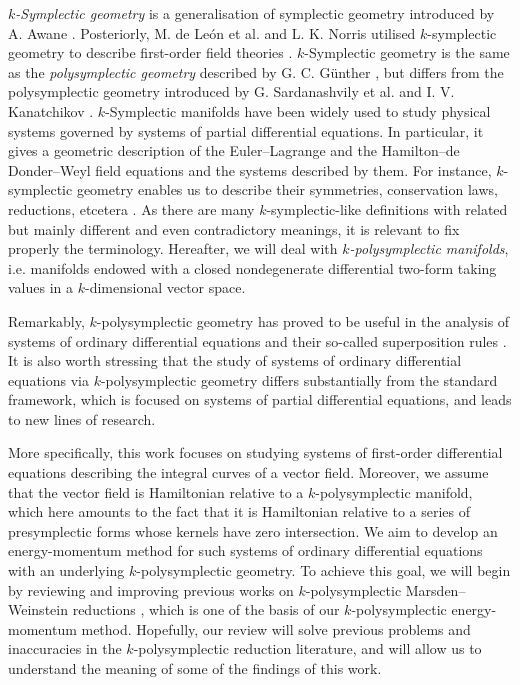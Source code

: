 \documentclass[11pt]{article}
\theoremstyle{plain}
\theoremstyle{definition}
\numberwithin{equation}{section}
\begin{document}
 {\it $k$-Symplectic geometry} is a generalisation of symplectic geometry introduced by A. Awane \cite{Awa_92,AG_00}. Posteriorly, M. de León et al. \cite{LMOS_97,LMS_88,LMS_88a} and L. K. Norris \cite{MN_00,Nor_93} utilised $k$-symplectic geometry  to describe first-order field theories \cite{BBLSV_15,EMR_96,RSV_07}. $k$-Symplectic geometry is the same as the {\it polysymplectic geometry} described by G. C. Günther \cite{Gun_87}, but differs from the polysymplectic geometry introduced by G. Sardanashvily et al. \cite{GMS_97,Sar_95} and I. V. Kanatchikov \cite{Kan_98}. $k$-Symplectic manifolds have been widely used to study physical systems governed by systems of partial differential equations. In particular, it gives a geometric description of the Euler--Lagrange and the Hamilton--de Donder--Weyl field equations 
and the systems described by them. For instance, $k$-symplectic geometry enables us to describe their symmetries, conservation laws, reductions, etcetera \cite{Awa_92, Gun_87, MRSV_15, RSV_07}. As there are many $k$-symplectic-like definitions with related but mainly different and even contradictory meanings, it is relevant to fix properly the terminology. Hereafter, we will deal with {\it $k$-polysymplectic manifolds}, i.e. manifolds endowed with a closed nondegenerate differential two-form taking values in a $k$-dimensional vector space. 
 
 
 Remarkably, $k$-polysymplectic geometry has proved to be useful in the analysis of systems of ordinary differential equations and their so-called superposition rules \cite{LV_15}. It is also worth stressing that the study of systems of ordinary differential equations via $k$-polysymplectic geometry differs substantially from the standard framework, which is focused on systems of partial differential equations, and leads to new lines of research.

More specifically, this work focuses on studying systems of first-order differential equations describing the integral curves of a vector field. Moreover, we assume that the vector field is Hamiltonian relative to a $k$-polysymplectic manifold, which here amounts to the fact that it is Hamiltonian relative to a series of presymplectic forms whose kernels have zero intersection. We aim to develop an energy-momentum method for such systems of ordinary differential equations with an underlying $k$-polysymplectic geometry. To achieve this goal, we will begin by reviewing and improving previous works on $k$-polysymplectic Marsden--Weinstein reductions \cite{Bla_19,LRVZ_23,GM_23,MRSV_15,MRS_04}, which is one of the basis of our $k$-polysymplectic energy-momentum method. Hopefully, our review will solve previous problems and inaccuracies in the $k$-polysymplectic reduction literature, and will allow us to understand the meaning of some of the findings of this work.  
\end{document}
